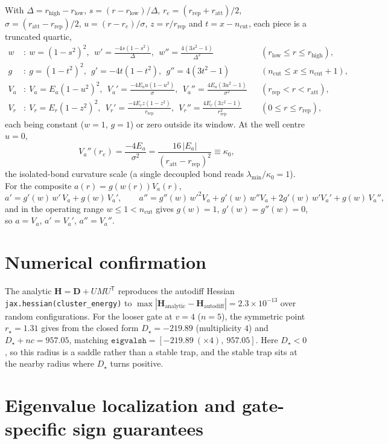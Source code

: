 \documentclass[11pt]{article}
\newcommand{\tp}{^{\mathsf T}}
\begin{document}
With $\Delta=r_{\mathrm{high}}-r_{\mathrm{low}}$, $s=(r-r_{\mathrm{low}})/\Delta$,
$r_e=(r_{\mathrm{rep}}+r_{\mathrm{att}})/2$, $\sigma=(r_{\mathrm{att}}-r_{\mathrm{rep}})/2$,
$u=(r-r_e)/\sigma$, $z=r/r_{\mathrm{rep}}$ and $t=x-n_{\mathrm{cut}}$, each piece is a
truncated quartic,
\[
\begin{aligned}
w&:\ w=(1-s^2)^2,\ \ w'=\tfrac{-4s(1-s^2)}{\Delta},\ \ w''=\tfrac{4(3s^2-1)}{\Delta^2}
   &&(r_{\mathrm{low}}\le r\le r_{\mathrm{high}}),\\
g&:\ g=(1-t^2)^2,\ \ g'=-4t(1-t^2),\ \ g''=4(3t^2-1)
   &&(n_{\mathrm{cut}}\le x\le n_{\mathrm{cut}}+1),\\
V_a&:\ V_a=E_a(1-u^2)^2,\ \ V_a'=\tfrac{-4E_a u(1-u^2)}{\sigma},\ \ V_a''=\tfrac{4E_a(3u^2-1)}{\sigma^2}
   &&(r_{\mathrm{rep}}< r< r_{\mathrm{att}}),\\
V_r&:\ V_r=E_r(1-z^2)^2,\ \ V_r'=\tfrac{-4E_r z(1-z^2)}{r_{\mathrm{rep}}},\ \ V_r''=\tfrac{4E_r(3z^2-1)}{r_{\mathrm{rep}}^2}
   &&(0\le r\le r_{\mathrm{rep}}),
\end{aligned}
\]
each being constant ($w=1$, $g=1$) or zero outside its window. At the well centre $u=0$,
\[
V_a''(r_e)=\frac{-4E_a}{\sigma^2}=\frac{16\,|E_a|}{(r_{\mathrm{att}}-r_{\mathrm{rep}})^2}\equiv\kappa_0,
\]
the isolated-bond curvature scale (a single decoupled bond reads
$\lambda_{\min}/\kappa_0=1$). For the composite $a(r)=g(w(r))V_a(r)$,
\[
a'=g'(w)\,w'\,V_a+g(w)\,V_a',\qquad
a''=g''(w)\,w'^2V_a+g'(w)\,w''V_a+2g'(w)\,w'V_a'+g(w)\,V_a'',
\]
and in the operating range $w\le1<n_{\mathrm{cut}}$ gives $g(w)=1$, $g'(w)=g''(w)=0$, so
$a=V_a$, $a'=V_a'$, $a''=V_a''$.

\section{Numerical confirmation}

The analytic $\mathbf{H}=\mathbf{D}+U M U\tp$ reproduces the autodiff Hessian
\texttt{jax.hessian(cluster\_energy)} to
$\max|\mathbf{H}_{\text{analytic}}-\mathbf{H}_{\text{autodiff}}|=2.3\times10^{-13}$ over
random configurations. For the looser gate at $v=4$ ($n=5$), the symmetric point
$r_\star=1.31$ gives from the closed form $D_\star=-219.89$ (multiplicity $4$) and
$D_\star+nc=957.05$, matching
$\texttt{eigvalsh}=[-219.89\ (\times4),\ 957.05]$. Here $D_\star<0$, so this radius is a
saddle rather than a stable trap, and the stable trap sits at the nearby radius where
$D_\star$ turns positive.

\section{Eigenvalue localization and gate-specific sign guarantees}
\end{document}
